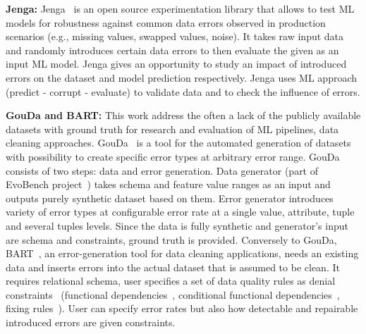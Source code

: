 
\textbf{Jenga:} 
Jenga~\cite{jenga} is an open source experimentation library that allows to test ML models for robustness against common data errors observed in production scenarios (e.g., missing values, swapped values, noise).
It takes raw input data and randomly introduces certain data errors to then evaluate the given as an input ML model.
Jenga gives an opportunity to study an impact of introduced errors on the dataset and model prediction respectively.
Jenga uses ML approach (predict - corrupt - evaluate) to validate data and to check the influence of errors.

\textbf{GouDa and BART:} 
This work address the often a lack of the publicly available datasets with ground truth for research and evaluation of ML pipelines, data cleaning approaches. 
GouDa~\cite{RestatGCS2022} is a tool for the automated generation of datasets with possibility to create specific error types at arbitrary error range.
GouDa consists of two steps: data and error generation.
Data generator (part of EvoBench project~\cite{evobench}) takes schema and feature value ranges as an input and outputs purely synthetic dataset based on them. 
Error generator introduces variety of error types at configurable error rate at a single value, attribute, tuple and several tuples levels.
Since the data is fully synthetic and generator's input are schema and constraints, ground truth is provided. 
Conversely to GouDa, BART~\cite{bart}, an error-generation tool for data cleaning applications, needs an existing data and inserts errors into the actual dataset that is assumed to be clean. It requires relational schema, user specifies
a set of data quality rules as denial constraints~\cite{denialconst} (functional dependencies~\cite{BohannonFGJK2007,  QahtanTOCS2020}, conditional functional dependencies~\cite{FanGJK2008}, fixing rules~\cite{fixingrules}). 
User can specify error rates but also how detectable and repairable introduced errors are given constraints.

